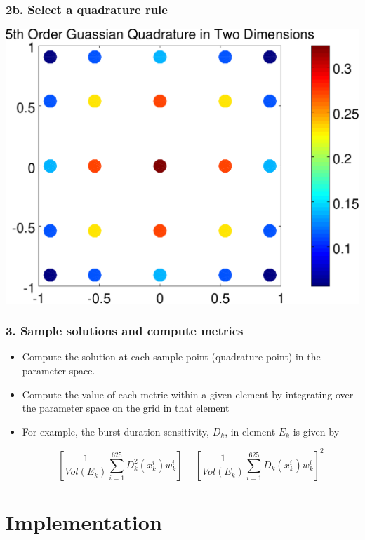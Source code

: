 \documentclass{beamer}
\theoremstyle{plain}
\theoremstyle{definition}
\begin{document}
\begin{frame}\frametitle{2b. Select a quadrature rule}
  \begin{center}
    \includegraphics[scale = .5]{gaussian-quadrature.pdf}
  \end{center}
\end{frame}

\begin{frame}\frametitle{3. Sample solutions and compute metrics}
 \begin{itemize}
  \item Compute the solution at each sample point (quadrature point) in the parameter space.
  \item Compute the value of each metric within a given element by integrating over the parameter space on the grid in that element
  \item For example, the burst duration sensitivity, $D_k$, in element $E_k$ is given by

  \begin{equation*}
   \left[\frac{1}{Vol(E_k)}\sum_{i=1}^{625}{D_k^2(x_k^i)w_k^i}\right] - \left[\frac{1}{Vol(E_k)}\sum_{i=1}^{625}{D_k(x_k^i)w_k^i}\right]^2
  \end{equation*}
 \end{itemize}
\end{frame}

\section{Implementation}
\end{document}
